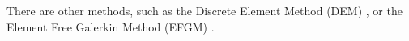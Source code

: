 
There are other methods, such as the 
Discrete Element Method (DEM) \cite{egho07,egsc07,funi14}, 
or the Element Free Galerkin Method (EFGM) \cite{hans03}.


